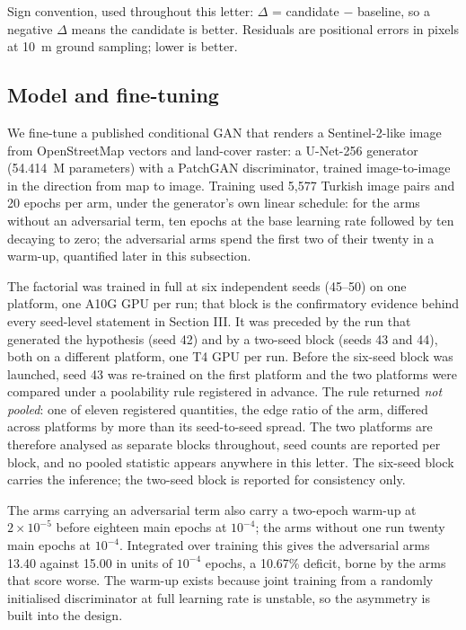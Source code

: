 Sign convention, used throughout this letter: $\Delta$ = candidate $-$ baseline, so
a negative $\Delta$ means the candidate is better. Residuals are positional errors in
pixels at 10~m ground sampling; lower is better.

\subsection{Model and fine-tuning}

We fine-tune a published conditional GAN \cite{guasch2026gencp} that renders a Sentinel-2-like image from
OpenStreetMap vectors and land-cover raster: a U-Net-256 generator (54.414~M parameters)
with a PatchGAN discriminator, trained image-to-image in the direction from map to image.
Training used 5,577 Turkish image pairs and 20 epochs per arm, under the generator's own
linear schedule: for the arms without an adversarial term, ten epochs at the base learning
rate followed by ten decaying to zero; the adversarial arms spend the first two of their
twenty in a warm-up, quantified later in this subsection.

The factorial was trained in full at six independent seeds (45--50) on one platform, one
A10G GPU per run; that block is the confirmatory evidence behind every seed-level statement
in Section III. It was preceded by the run that generated the hypothesis (seed 42) and by a
two-seed block (seeds 43 and 44), both on a different platform, one T4 GPU per run. Before
the six-seed block was launched, seed 43 was re-trained on the first platform and the two
platforms were compared under a poolability rule registered in advance. The rule returned
\emph{not pooled}: one of eleven registered quantities, the edge ratio of the \advLone{} arm, differed across platforms by more than its seed-to-seed spread. The two platforms
are therefore analysed as separate blocks throughout, seed counts are reported per block,
and no pooled statistic appears anywhere in this letter. The six-seed block carries the
inference; the two-seed block is reported for consistency only.

The arms carrying an adversarial term also carry a two-epoch warm-up at $2\times10^{-5}$
before eighteen main epochs at $10^{-4}$; the arms without one run twenty main epochs at
$10^{-4}$. Integrated over training this gives the adversarial arms 13.40 against
15.00 in units of $10^{-4}$ epochs, a 10.67\% deficit, borne by the arms that score
worse. The warm-up exists because joint training from a randomly initialised
discriminator at full learning rate is unstable, so the asymmetry is built into the design.

